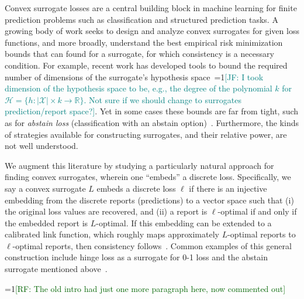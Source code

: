 \documentclass[11pt]{article}
\newcommand{\Comments}{1}
\newcommand{\mynote}[2]{\ifnum\Comments=1\textcolor{#1}{#2}\fi}
\newcommand{\raf}[1]{\mynote{darkgreen}{[RF: #1]}}
\newcommand{\jessie}[1]{\mynote{teal}{[JF: #1]}}
\newcommand{\reals}{\mathbb{R}}
\renewcommand{\H}{\mathcal{H}}
\newcommand{\X}{\mathcal{X}}
\begin{document}
Convex surrogate losses are a central building block in machine learning for finite prediction problems such as classification and structured prediction tasks.
A growing body of work seeks to design and analyze convex surrogates for given loss functions, and more broadly, understand the best empirical risk minimization bounds that can found for a surrogate, for which consistency is a necessary condition.
For example, recent work has developed tools to bound the required number of dimensions of the surrogate's hypothesis space~\cite{frongillo2015elicitation,  ramaswamy2016convex}\jessie{I took dimension of the hypothesis space to be, e.g., the degree of the polynomial $k$ for $\H = \{h : |\X| \times k \to \reals\}$.  Not sure if we should change to surrogates prediction/report space?}.
Yet in some cases these bounds are far from tight, such as for \emph{abstain loss} (classification with an abstain option)~\citep{bartlett2008classification,yuan2010classification,ramaswamy2016convex,ramaswamy2018consistent,zhang2018reject}.
Furthermore, the kinds of strategies available for constructing surrogates, and their relative power, are not well understood.

We augment this literature by studying a particularly natural approach for finding convex surrogates, wherein one ``embeds'' a discrete loss.
Specifically, we say a convex surrogate $L$ embeds a discrete loss $\ell$ if there is an injective embedding from the discrete reports (predictions) to a vector space such that (i) the original loss values are recovered, and (ii) a report is $\ell$-optimal if and only if the embedded report is $L$-optimal.
If this embedding can be extended to a calibrated link function, which roughly maps approximately $L$-optimal reports to $\ell$-optimal reports, then consistency follows~\citep{agarwal2015consistent}.
Common examples of this general construction include hinge loss as a surrogate for 0-1 loss and the abstain surrogate mentioned above~\citep{ramaswamy2018consistent}.


\raf{The old intro had just one more paragraph here, now commented out}
\end{document}
